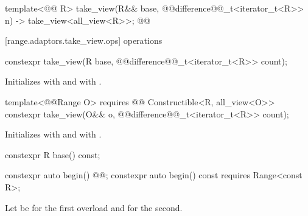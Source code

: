 {\begin{codeblock}
{  template<@@ R>
  take_view(R&& base, @@difference@@_t<iterator_t<R>> n)
    -> take_view<all_view<R>>;
}@\oldtxt{\}}@
\end{codeblock}

[range.adaptors.take_view.ops]{ operations}

%
\begin{itemdecl}
constexpr take_view(R base, @@difference@@_t<iterator_t<R>> count);
\end{itemdecl}

\begin{itemdescr}
\pnum
\effects Initializes  with  and 
 with .
\end{itemdescr}

%
\begin{itemdecl}
template<@@Range O>
  requires @@ Constructible<R, all_view<O>>
constexpr take_view(O&& o, @@difference@@_t<iterator_t<R>> count);
\end{itemdecl}

\begin{itemdescr}
\pnum
\effects Initializes  with 
and   with .
\end{itemdescr}

%
\begin{itemdecl}
constexpr R base() const;
\end{itemdecl}

\begin{itemdescr}
\pnum
\oldtxt{\returns}  
\end{itemdescr}

%
\begin{itemdecl}
constexpr auto begin() @@;
constexpr auto begin() const requires Range<const R>;
\end{itemdecl}

\begin{itemdescr}
{\color{newclr}
\pnum
Let  be  for the first overload and  for the
second.
} %


\end{itemdescr}}
